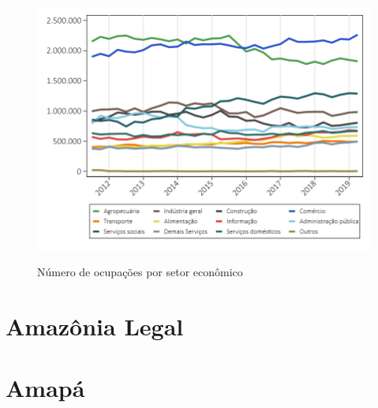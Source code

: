 \documentclass[8pt]{beamer}
\begin{document}
\begin{frame}[label=_importancia_relativa]
\textit{\hyperlink{indice_principal_amz}{}}
\begin{figure}
  \centering
  \includegraphics[width=.85\linewidth]{./../analysis/output/_importancia_relativa.png}
  \label{_importancia_relativa}
  \caption{{Número de ocupações por setor econômico}}
\end{figure}
\end{frame}

\section{Amazônia Legal}

\begin{frame}[label=amzcod2dig]{}
\textit{\hyperlink{indice_principal}{}}

\end{frame}

\begin{frame}[label=amzcnae2dig]{}
\textit{\hyperlink{indice_principal}{}}

\end{frame}

\section{Amapá}

\begin{frame}[label=amzapcod2dig]{}
\textit{\hyperlink{indice_principal}{}}

\end{frame}

\begin{frame}[label=amzapcnae2dig]{}
\textit{\hyperlink{indice_principal}{}}

\end{frame}
\end{document}
